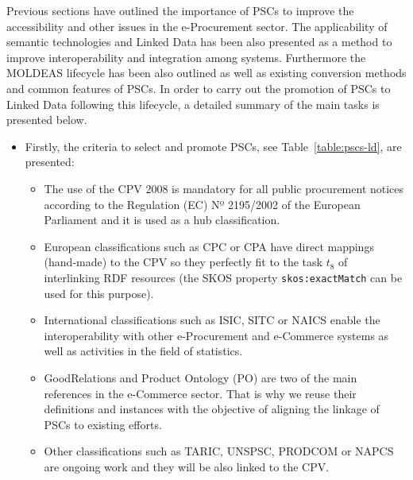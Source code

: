 Previous sections have outlined the importance of PSCs to improve the accessibility and other issues in 
the e-Procurement sector. The applicability of semantic technologies and Linked Data has been also presented 
as a method to improve interoperability and integration among systems. Furthermore the MOLDEAS lifecycle has been 
also outlined as well as existing conversion methods and common features of PSCs. In order to carry out 
the promotion of PSCs to Linked Data following this lifecycle, a detailed summary of the main tasks is presented below.

\begin{itemize}
 \item  Firstly, the criteria to select and promote PSCs, see Table~\ref{table:pscs-ld}, are presented:
\begin{itemize}
 \item The use of the CPV 2008 is mandatory for all public procurement notices according 
 to the Regulation (EC) Nº 2195/2002 of the European Parliament and it is used as a hub classification.
 \item European classifications such as CPC or CPA have direct mappings (hand-made) to the CPV so they perfectly fit 
 to the task $t_8$ of interlinking RDF resources (the SKOS property \texttt{skos:exactMatch} can be used for this purpose).
 \item International classifications such as ISIC, SITC or NAICS enable the interoperability with 
 other e-Procurement and e-Commerce systems as well as activities in the field of statistics.
 \item GoodRelations and Product Ontology (PO) are two of the main references in the e-Commerce sector. 
 That is why we reuse their definitions and instances with the objective of aligning the linkage of PSCs to existing efforts. 
 \item Other classifications such as TARIC, UNSPSC, PRODCOM or NAPCS are ongoing work and they will be also linked to the CPV.
\end{itemize}


\end{itemize}
